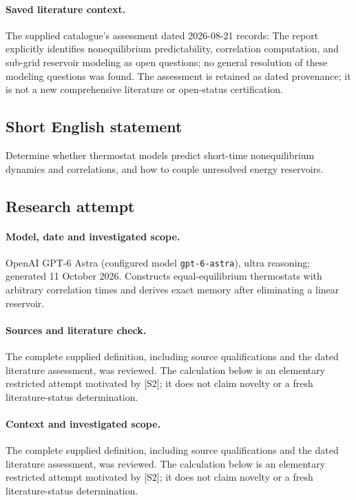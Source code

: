 \documentclass[11pt]{article}
\begin{document}
\paragraph{Saved literature context.} The supplied catalogue's assessment dated 2026-08-21 records: The report explicitly identifies nonequilibrium predictability, correlation computation, and sub-grid reservoir modeling as open questions; no general resolution of these modeling questions was found. The assessment is retained as dated provenance; it is not a new comprehensive literature or open-status certification.
\subsection{Short English statement}
Determine whether thermostat models predict short-time nonequilibrium dynamics and correlations, and how to couple unresolved energy reservoirs.
\subsection{Research attempt}
\paragraph{Model, date and investigated scope.}
OpenAI GPT-6 Astra (configured model \texttt{gpt-6-astra}), ultra reasoning; generated 11 October 2026. Constructs equal-equilibrium thermostats with arbitrary correlation times and derives exact memory after eliminating a linear reservoir.

\paragraph{Sources and literature check.}
The complete supplied definition, including source qualifications and the dated literature assessment, was reviewed. The calculation below is an elementary restricted attempt motivated by [S2]; it does not claim novelty or a fresh literature-status determination.

\paragraph{Context and investigated scope.} The complete supplied definition, including source qualifications and the dated literature assessment, was reviewed. The calculation below is an elementary restricted attempt motivated by [S2]; it does not claim novelty or a fresh literature-status determination.
\end{document}

